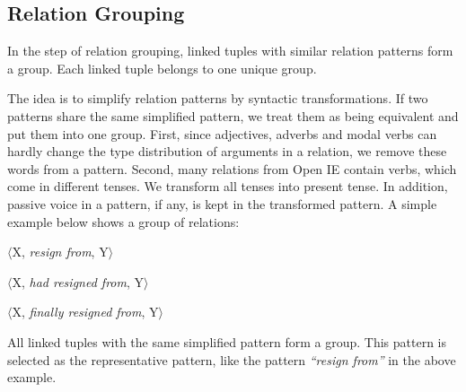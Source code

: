 \subsection{Relation Grouping}
In the step of relation grouping, linked tuples with similar relation patterns form a group.
Each linked tuple belongs to one unique group.



The idea is to simplify relation patterns by syntactic transformations.
If two patterns share the same simplified pattern, we treat them as
being equivalent and put them into one group.
First, since adjectives, adverbs and modal verbs can hardly change the
type distribution of arguments in a relation,
we remove these words from a pattern.
Second, many relations from Open IE contain verbs, which come in
different tenses. We transform all tenses into present tense.
In addition, passive voice in a pattern, if any, is kept in
the transformed pattern.
A simple example below shows a group of relations:
\begin{center}
    $\langle$X, \textit{resign from}, Y$\rangle$
    
    $\langle$X, \textit{had resigned from}, Y$\rangle$
    
    $\langle$X, \textit{finally resigned from}, Y$\rangle$
\end{center}

All linked tuples with the same simplified pattern form a group.
This pattern is selected as the representative pattern, like the pattern \textit{``resign from''}
in the above example.
